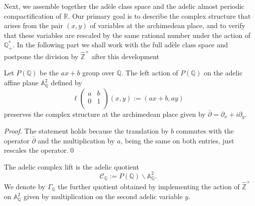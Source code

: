 \documentclass[graybox, envcountsect%
]{svmult}
\def\A{{\mathbb A}}
\def\Q{{\mathbb Q}}
\def\R{{\mathbb R}}
\def\Z{{\mathbb Z}}
\def\hatz{{\hat\Z^\times}}
\def\cC{{\mathcal C}}
\def\gaq{{\Gamma_\Q}}
\def\caq{{\cC_\Q}}
\begin{document}
Next, we assemble together the ad\`ele class space and the adelic almost periodic compactification of $\R$. Our primary goal is to describe  the complex structure that arises  from the pair $(x,y)$ of variables at the archimedean place, and to verify that these variables are rescaled by the same rational number under the action of $\Q_+^*$. \newline
 In the following part we shall work with the full ad\`ele class space and postpone the division by $\hatz$ after this development 
\begin{lemma}\label{adelicomp1} Let $P(\Q)$ be the $ax+b$ group over $\Q$. The left action of $P(\Q)$ on the adelic affine plane $\A_\Q^2$ defined by 
\begin{equation}\label{actionpq}
	\ell\left(
\begin{array}{cc}
 a & b \\
 0 & 1 \\
\end{array}
\right)(x,y):=(ax+b,ay)
\end{equation}
	preserves the complex structure at the archimedean place given by  $\bar\partial=\partial_x+i\partial_y$.
\end{lemma}
\begin{proof} The statement holds because the translation by $b$ commutes with the operator $\bar\partial$ and the multiplication by $a$, being the same on both entries, just rescales the operator.\qed\end{proof} 

\begin{definition}\label{adelicomp2} The {\rm adelic complex lift} is the adelic quotient 
	\begin{equation}\label{adelicomp3}
	\caq:=P(\Q)\backslash 	\A_\Q^2.
	\end{equation}
	We denote by $\gaq$ the further quotient obtained  by implementing the action of $\hatz$ on  $\A_\Q^2$ given by multiplication on the second adelic variable $y$.
\end{definition}
\end{document}
